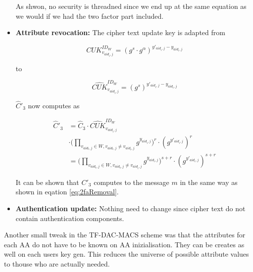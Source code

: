 \begin{itemize}
As shwon, no security is threadned since we end up at the same equation as we would if we had the two factor part included. 

\item \textbf{Attribute revocation:}
The cipher text update key is adapted from

$$
CUK^{ID_W}_{v_{aid_i,j}} = (g^s \cdotp g^\alpha)^{y'_{aid_i,j} - y_{aid_i,j}}
$$

to 

$$
\widehat{CUK}^{ID_W}_{v_{aid_i,j}} = (g^s)^{y'_{aid_i,j} - y_{aid_i,j}}
$$

$\widehat{C}'_3$ now computes as 

\begin{equation}
\begin{split}
\widehat{C}'_3 &= \widehat{C}_3 \cdotp \widehat{CUK}^{ID_W}_{v_{aid_i,j}} \\
&\cdotp \Big( \prod_{v_{aid_{t}, j}\in W, v_{aid_t, j} \neq v_{aid_i,j}} g^{y_{aid_{i}, j}} \Big)^{r} \cdotp (g^{y'_{aid_i,j}})^{r} \\
&= \Big( \prod_{v_{aid_{t}, j}\in W, v_{aid_t, j} \neq v_{aid_i,j}} g^{y_{aid_{i}, j}} \Big)^{s + r} \cdotp (g^{y'_{aid_i,j}})^{s + r}
\end{split}
\end{equation}

It can be shown that $C'_3$ computes to the message $m$ in the same way as shown in eqation \ref{eq:2faRemoval}.

\item \textbf{Authentication update:}
Nothing need to change since cipher text do not contain authentication components. 
\end{itemize}

Another small tweak in the TF-DAC-MACS scheme was that the attributes for each AA do not have to be known on AA inizialisation. They can be creates as well on each users key gen. This reduces the universe of possible attribute values to thouse who are actually needed.